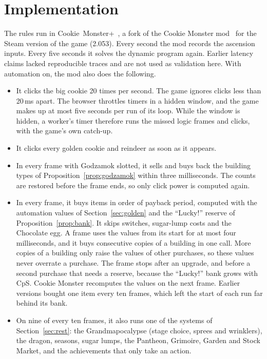 \documentclass[11pt,a4paper]{article}
\numberwithin{equation}{section}
\theoremstyle{definition}
\theoremstyle{remark}
\newcommand{\Lucky}{\textup{``Lucky!''}}
\begin{document}
\section{Implementation}\label{sec:implementation}
The rules run in Cookie~Monster+~\cite{cmplus}, a fork of the Cookie Monster mod~\cite{cm} for the Steam version of the game (2.053). Every second the mod records the ascension inputs. Every five seconds it solves the dynamic program again. Earlier latency claims lacked reproducible traces and are not used as validation here. With automation on, the mod also does the following.
\begin{itemize}
\item It clicks the big cookie 20 times per second. The game ignores clicks less than 20\,ms apart. The browser throttles timers in a hidden window, and the game makes up at most five seconds per run of its loop. While the window is hidden, a worker's timer therefore runs the missed logic frames and clicks, with the game's own catch-up.
\item It clicks every golden cookie and reindeer as soon as it appears.
\item In every frame with Godzamok slotted, it sells and buys back the building types of Proposition~\ref{prop:godzamok} within three milliseconds. The counts are restored before the frame ends, so only click power is computed again.
\item In every frame, it buys items in order of payback period, computed with the automation values of Section~\ref{sec:golden} and the \Lucky{} reserve of Proposition~\ref{prop:bank}. It skips switches, sugar-lump costs and the Chocolate egg. A frame uses the values from its start for at most four milliseconds, and it buys consecutive copies of a building in one call. More copies of a building only raise the values of other purchases, so these values never overrate a purchase. The frame stops after an upgrade, and before a second purchase that needs a reserve, because the \Lucky{} bank grows with CpS. Cookie Monster recomputes the values on the next frame. Earlier versions bought one item every ten frames, which left the start of each run far behind its bank.
\item On nine of every ten frames, it also runs one of the systems of Section~\ref{sec:rest}: the Grandmapocalypse (stage choice, sprees and wrinklers), the dragon, seasons, sugar lumps, the Pantheon, Grimoire, Garden and Stock Market, and the achievements that only take an action.

\end{itemize}
\end{document}
